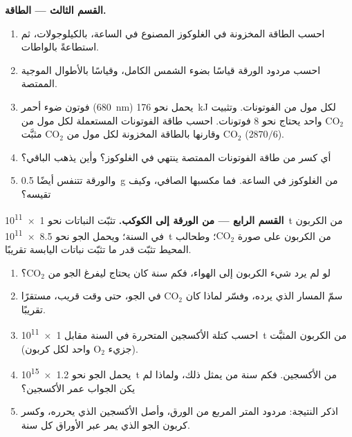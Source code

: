 \begin{problem}
\medskip
\noindent\textbf{القسم الثالث --- الطاقة.}
\begin{enumerate}[resume]
  \item احسب الطاقة المخزونة في الغلوكوز المصنوع في الساعة،
        بالكيلوجولات، ثم استطاعةً بالواطات.
  \item احسب مردود الورقة قياسًا بضوء الشمس الكامل، وقياسًا بالأطوال
        الموجية الممتصة.
  \item فوتون ضوء أحمر (\qty{680}{nm}) يحمل نحو \qty{176}{kJ} لكل مول
        من الفوتونات. وتثبيت $\mathrm{CO_2}$ واحد يحتاج نحو 8
        فوتونات. احسب طاقة الفوتونات المستعملة لكل مول من
        $\mathrm{CO_2}$ وقارنها بالطاقة المخزونة لكل مول من
        $\mathrm{CO_2}$ مثبَّت ($2870/6$).
  \item أي كسر من طاقة الفوتونات الممتصة ينتهي في الغلوكوز؟ وأين يذهب
        الباقي؟
  \item والورقة تتنفس أيضًا \qty{0.5}{g} من الغلوكوز في الساعة. فما
        مكسبها الصافي، وكيف تقيسه؟
\end{enumerate}

\medskip
\noindent\textbf{القسم الرابع --- من الورقة إلى الكوكب.}
تثبّت النباتات نحو \qty{1e11}{t} من الكربون في السنة؛ ويحمل الجو نحو
\qty{8.5e11}{t} من الكربون على صورة $\mathrm{CO_2}$؛ وطحالب المحيط
تثبّت قدر ما تثبّت نباتات اليابسة تقريبًا.
\begin{enumerate}[resume]
  \item لو لم يرد شيء الكربون إلى الهواء، فكم سنة كان 
        يحتاج ليفرغ الجو من $\mathrm{CO_2}$؟
  \item سمّ المسار الذي يرده، وفسّر لماذا كان $\mathrm{CO_2}$ في الجو،
        حتى وقت قريب، مستقرًا تقريبًا.
  \item احسب كتلة الأكسجين المتحررة في السنة مقابل \qty{1e11}{t}
        من الكربون المثبَّت (جزيء $\mathrm{O_2}$ واحد لكل كربون).
  \item يحمل الجو نحو \qty{1.2e15}{t} من الأكسجين. فكم سنة من  يمثل ذلك، ولماذا لم يكن الجواب عمر الأكسجين؟
  \item اذكر النتيجة: مردود المتر المربع من الورق، وأصل الأكسجين الذي
        يحرره، وكسر كربون الجو الذي يمر عبر الأوراق كل سنة.
\end{enumerate}
\end{problem}
